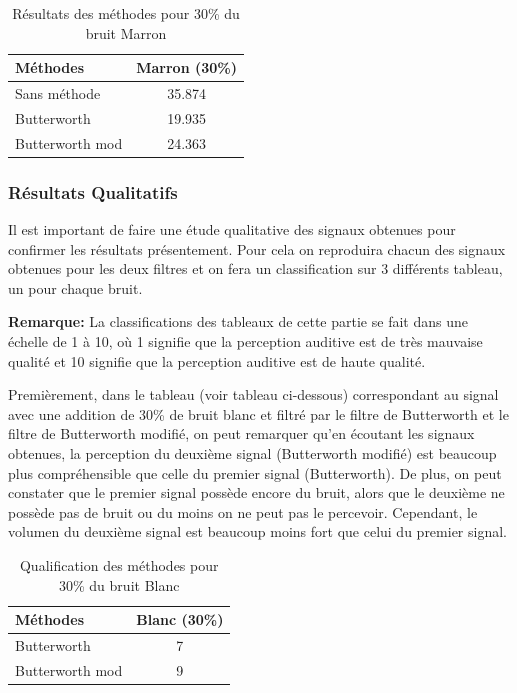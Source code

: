 \documentclass[conference,onecolumn]{IEEEtran}
\begin{document}
\begin{table}[H]
    \centering
    \begin{tabular}{ l  c }
    \textbf{Méthodes} & \textbf{Marron (30\%)} \\
    \hline
    Sans méthode &  35.874\\
    Butterworth &  19.935\\
    Butterworth mod &  24.363\\
    \end{tabular}
    \caption{Résultats des méthodes pour 30\% du bruit Marron}
    \label{table:t9}
\end{table}

\subsubsection{Résultats Qualitatifs}

Il est important de faire une étude qualitative des signaux obtenues pour confirmer les résultats présentement. Pour cela on reproduira chacun des signaux obtenues pour les deux filtres et on fera un classification sur 3 différents tableau, un pour chaque bruit. 

\textbf{Remarque: } La classifications des tableaux de cette partie se fait dans une échelle de 1 à 10, où 1 signifie que la perception auditive est de très mauvaise qualité et 10 signifie que la perception auditive est de haute qualité.

Premièrement, dans le tableau (voir tableau ci-dessous) correspondant au signal avec une addition de 30\% de bruit blanc et filtré par le filtre de Butterworth et le filtre de Butterworth modifié, on peut remarquer qu'en écoutant les signaux obtenues, la perception du deuxième signal (Butterworth modifié) est beaucoup plus compréhensible que celle du premier signal (Butterworth). De plus, on peut constater que le premier signal possède encore du bruit, alors que le deuxième ne possède pas de bruit ou du moins on ne peut pas le percevoir. Cependant, le volumen du deuxième signal est beaucoup moins fort que celui du premier signal.

\begin{table}[H]
    \centering
    \begin{tabular}{ l  c }
    \textbf{Méthodes} & \textbf{Blanc (30\%)} \\
    \hline
    Butterworth &  7\\
    Butterworth mod &  9\\
    \end{tabular}
    \caption{Qualification des méthodes pour 30\% du bruit Blanc}
    \label{table:t10}
\end{table}
\end{document}
